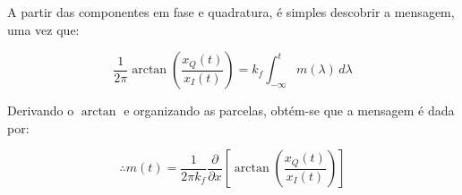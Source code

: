 A partir das componentes em fase e quadratura, é simples descobrir a mensagem, uma vez que:

\begin{equation*}
    \frac{1}{2\pi} \arctan{\left(\frac{x_Q(t)}{x_I(t)}\right)}= k_f  \int_{-\infty}^{t} m(\lambda) \,d\lambda
\end{equation*}

Derivando o $\arctan{}$ e organizando as parcelas, obtém-se que a mensagem é dada por:

\begin{equation*}
    \therefore m(t) = \frac{1}{2\pi k_f} \frac{\partial}{\partial x}\left[\arctan{\left(\frac{x_Q(t)}{x_I(t)}\right)}\right]
\end{equation*}
